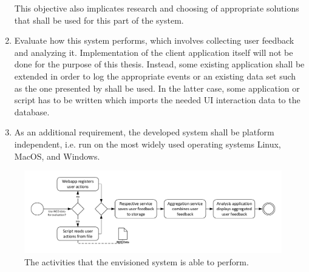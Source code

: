 \begin{enumerate}
This objective also implicates research and choosing of appropriate solutions that shall be used for this part of the system.
\item Evaluate how this system performs, which involves collecting user feedback and analyzing it.
Implementation of the client application itself will not be done for the purpose of this thesis.
Instead, some existing application shall be extended in order to log the appropriate events or an existing data set such as the one presented by \citet{Deka:2017:Rico} shall be used.
In the latter case, some application or script has to be written which imports the needed UI interaction data to the database.
\item As an additional requirement, the developed system shall be platform independent, i.e. run on the most widely used operating systems Linux, MacOS, and Windows.
\end{enumerate}

\begin{figure}[htb]
        \includegraphics[width=1.1\textwidth]{gfx/architecture-3}
        \caption{The activities that the envisioned system is able to perform.}
        \label{fig:system:vision}
\end{figure}
